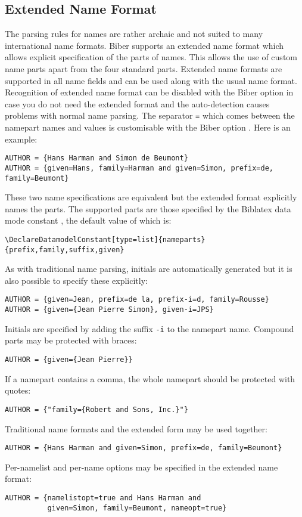 \documentclass{ltxdockit}
\newcommand*{\biber}{Biber\xspace}
\newcommand*{\biblatex}{Biblatex\xspace}
\begin{document}
\subsection{Extended Name Format}
\label{biber:xname}
The parsing rules for \bibtex names are rather archaic and not suited to
many international name formats. \biber supports an extended name format
which allows explicit specification of the parts of names. This allows the
use of custom name parts apart from the four standard \bibtex parts. Extended
name formats are supported in all name fields and can be used along with
the usual \bibtex name format. Recognition of extended name format can be
disabled with the \biber option  in case you do not need the
extended format and the auto-detection causes problems with normal name
parsing. The separator \verb+=+ which comes between the namepart names and
values is customisable with the \biber option . Here is an
example:
\begin{verbatim}
AUTHOR = {Hans Harman and Simon de Beumont}
AUTHOR = {given=Hans, family=Harman and given=Simon, prefix=de, family=Beumont}
\end{verbatim}
%
These two name specifications are equivalent but the extended format
explicitly names the parts. The supported parts are those specified by the
\biblatex data mode constant , the default value of which
is:
\begin{verbatim}
\DeclareDatamodelConstant[type=list]{nameparts}{prefix,family,suffix,given}
\end{verbatim}
%
As with traditional \bibtex name parsing, initials are automatically
generated but it is also possible to specify these explicitly:
\begin{verbatim}
AUTHOR = {given=Jean, prefix=de la, prefix-i=d, family=Rousse}
AUTHOR = {given={Jean Pierre Simon}, given-i=JPS}
\end{verbatim}
%
Initials are specified by adding the suffix \verb+-i+ to the namepart name.
Compound parts may be protected with braces:
\begin{verbatim}
AUTHOR = {given={Jean Pierre}}
\end{verbatim}
%
If a namepart contains a comma, the whole namepart should be protected with
quotes:
\begin{verbatim}
AUTHOR = {"family={Robert and Sons, Inc.}"}
\end{verbatim}
%
Traditional \bibtex name formats and the extended form may be used together:
\begin{verbatim}
AUTHOR = {Hans Harman and given=Simon, prefix=de, family=Beumont}
\end{verbatim}
%
Per-namelist and per-name options may be specified in the extended name
format:
\begin{verbatim}
AUTHOR = {namelistopt=true and Hans Harman and
          given=Simon, family=Beumont, nameopt=true}
\end{verbatim}
\end{document}
